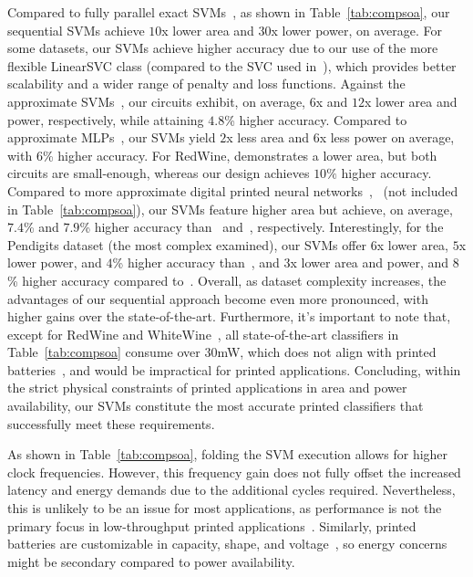 Compared to fully parallel exact SVMs~\cite{Mubarik:MICRO:2020:printedml}, as shown in Table~\ref{tab:compsoa}, our sequential SVMs achieve $10$x lower area and $30$x lower power, on average.
For some datasets, our SVMs achieve higher accuracy due to our use of the more flexible LinearSVC class (compared to the SVC used in~\cite{Mubarik:MICRO:2020:printedml}), which provides better scalability and a wider range of penalty and loss functions.
Against the approximate SVMs~\cite{Armeniakos:TCAD2023:cross}, our circuits exhibit, on average, $6$x and $12$x lower area and power, respectively, while attaining $4.8$\% higher accuracy.
Compared to approximate MLPs~\cite{Armeniakos:TC2023:codesign}, our SVMs yield $2$x less area and $6$x less power on average, with $6$\% higher accuracy.
For RedWine, \cite{Armeniakos:TC2023:codesign} demonstrates a lower area, but both circuits are small-enough, whereas our design achieves $10\%$ higher accuracy.
Compared to more approximate digital printed neural networks~\cite{Mrazek:ICCAD2024},~\cite{Afentaki:ICCAD23:hollistic} (not included in Table~\ref{tab:compsoa}), our SVMs feature higher area but achieve, on average, $7.4$\% and $7.9$\% higher accuracy than~\cite{Mrazek:ICCAD2024} and~\cite{Afentaki:ICCAD23:hollistic}, respectively.
Interestingly, for the Pendigits dataset (the most complex examined), our SVMs offer $6$x lower area, $5$x lower power, and $4$\% higher accuracy than~\cite{Mrazek:ICCAD2024}, and $3$x lower area and power, and $8$\% higher accuracy compared to~\cite{Afentaki:ICCAD23:hollistic}.
Overall, as dataset complexity increases, the advantages of our sequential approach become even more pronounced, with higher gains over the state-of-the-art.
Furthermore, it's important to note that, except for RedWine and WhiteWine~\cite{Armeniakos:TC2023:codesign}, all state-of-the-art classifiers in Table~\ref{tab:compsoa} consume over $30$mW, which does not align with printed batteries~\cite{Mubarik:MICRO:2020:printedml}, and would be impractical for printed applications.
Concluding, within the strict physical constraints of printed applications in area and power availability, our SVMs constitute the most accurate printed classifiers that successfully meet these requirements.




As shown in Table~\ref{tab:compsoa}, folding the SVM execution allows for higher clock frequencies.
However, this frequency gain does not fully offset the increased latency and energy demands due to the additional cycles required.
Nevertheless, this is unlikely to be an issue for most applications, as performance is not the primary focus in low-throughput printed applications~\cite{Henkel:ICCAD2022:expedition}.
Similarly, printed batteries are customizable in capacity, shape, and voltage~\cite{PrintedBatteries2018}, so energy concerns might be secondary compared to power availability.